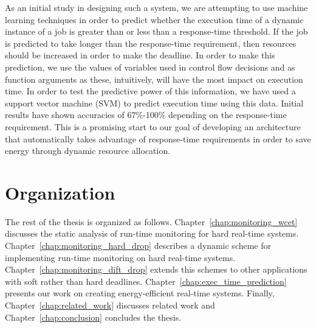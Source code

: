 As an initial study in designing such a system, we are attempting to use
machine learning techniques in order to predict whether the execution time of a
dynamic instance of a job is greater than or less than a response-time
threshold. If the job is predicted to take longer than the response-time
requirement, then resources should be increased in order to make the deadline.
In order to make this prediction, we use the values of variables used in
control flow decisions and as function arguments as these, intuitively, will
have the most impact on execution time. In order to test the predictive power
of this information, we have used a support vector machine (SVM) to predict
execution time using this data. Initial results have shown accuracies of
67\%-100\% depending on the response-time requirement. This is a promising
start to our goal of developing an architecture that automatically takes
advantage of response-time requirements in order to save energy through dynamic
resource allocation.

\section{Organization}
The rest of the thesis is organized as follows.
Chapter~\ref{chap:monitoring_wcet} discusses the static analysis of run-time
monitoring for hard real-time systems. Chapter~\ref{chap:monitoring_hard_drop}
describes a dynamic scheme for implementing run-time monitoring on hard
real-time systems. Chapter~\ref{chap:monitoring_dift_drop} extends this schemes
to other applications with soft rather than hard deadlines.
Chapter~\ref{chap:exec_time_prediction} presents our work on creating
energy-efficient real-time systems. Finally, Chapter~\ref{chap:related_work}
discusses related work and Chapter~\ref{chap:conclusion} concludes the thesis.
